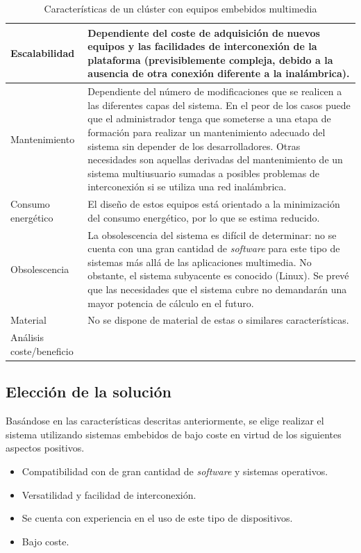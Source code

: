 \begin{table}[H]
\begin{tabular}{|p{2.4cm}|p{12cm}|}
\hline
Escalabilidad&Dependiente del coste de adquisición de nuevos equipos y las facilidades de interconexión de la plataforma (previsiblemente compleja, debido a la ausencia de otra conexión diferente a la inalámbrica).\\
\hline
Mantenimiento&Dependiente del número de modificaciones que se realicen a las diferentes capas del sistema. En el peor de los casos puede que el administrador tenga que someterse a una etapa de formación para realizar un mantenimiento adecuado del sistema sin depender de los desarrolladores. Otras necesidades son aquellas derivadas del mantenimiento de un sistema multiusuario sumadas a posibles problemas de interconexión si se utiliza una red inalámbrica.\\
\hline
Consumo energético&El diseño de estos equipos está orientado a la minimización del consumo energético, por lo que se estima reducido.\\
\hline
Obsolescencia&La obsolescencia del sistema es difícil de determinar: no se cuenta con una gran cantidad de \textit{software} para este tipo de sistemas más allá de las aplicaciones multimedia. No obstante, el sistema subyacente es conocido (Linux).
Se prevé que las necesidades que el sistema cubre no demandarán una mayor potencia de cálculo en el futuro.\\
\hline
Material&No se dispone de material de estas o similares características.\\
\hline
Análisis coste/beneficio&\\
\hline
\end{tabular}
\caption{Características de un clúster con equipos embebidos multimedia}
\end{table}

\subsection{Elección de la solución}

Basándose en las características descritas anteriormente, se elige realizar el sistema utilizando sistemas embebidos de bajo coste en virtud de los siguientes aspectos positivos.

\begin{itemize}[noitemsep]
\item Compatibilidad con de gran cantidad de \textit{software} y sistemas operativos.
\item Versatilidad y facilidad de interconexión.
\item Se cuenta con experiencia en el uso de este tipo de dispositivos.
\item Bajo coste.
\end{itemize}


